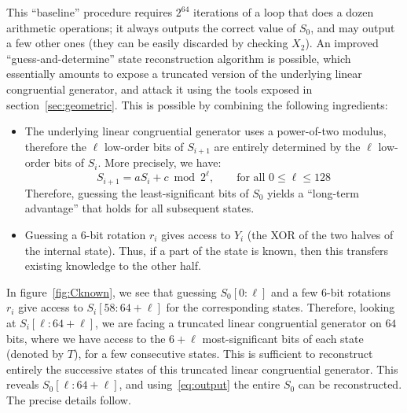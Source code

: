 \documentclass[journal=tosc,final]{iacrtrans}
\begin{document}
This ``baseline'' procedure requires $2^{64}$ iterations of a loop that does a
dozen arithmetic operations; it always outputs the correct value of $S_0$, and
may output a few other ones (they can be easily discarded by checking $X_2$). An
improved ``guess-and-determine'' state reconstruction algorithm is possible,
which essentially amounts to expose a truncated version of the underlying linear
congruential generator, and attack it using the tools exposed in
section~\ref{sec:geometric}. This is possible by combining the following
ingredients:
\begin{itemize}
\item The underlying linear congruential generator uses a power-of-two modulus,
  therefore the $\ell$ low-order bits of $S_{i+1}$ are entirely determined by
  the $\ell$ low-order bits of $S_i$. More precisely, we have:
  \begin{equation}\label{eq:lcg}
    S_{i+1} = aS_i + c \bmod 2^\ell, \qquad \text{for all } 0 \leq \ell \leq 128
  \end{equation}
  Therefore, guessing the least-significant bits of $S_0$ yields a ``long-term
  advantage'' that holds for all subsequent states.

\item Guessing a 6-bit rotation $r_i$ gives access to $Y_i$ (the XOR of the two
  halves of the internal state). Thus, if a part of the state is known, then
  this transfers existing knowledge to the other half.
\end{itemize}

In figure~\ref{fig:Cknown}, we see that guessing $S_0[0:\ell]$ and a few 6-bit
rotations $r_i$ give access to $S_i[58:64+\ell]$ for the corresponding
states. Therefore, looking at $S_i[\ell:64+\ell]$, we are facing a truncated
linear congruential generator on $64$ bits, where we have access to the
$6+\ell$ most-significant bits of each state (denoted by $T$), for a few consecutive states. This
is sufficient to reconstruct entirely the successive states of this truncated
linear congruential generator. This reveals $S_0[\ell:64+\ell]$, and
using~\eqref{eq:output} the entire $S_0$ can be reconstructed. The precise
details follow.
\end{document}
